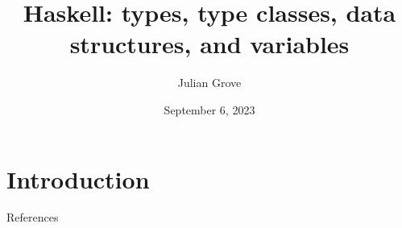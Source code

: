 \documentclass[presentation]{beamer}
\author{Julian Grove}
\date{September 6, 2023}
\title{Haskell: types, type classes, data structures, and variables}
\institute[University of Rochester]{FACTS.lab, University of Rochester}
\begin{document}
\maketitle

\section{Introduction}
\label{sec:orgd5ef12d}

\begin{frame}[allowframebreaks]{References}
\printbibliography
\end{frame}
\end{document}

